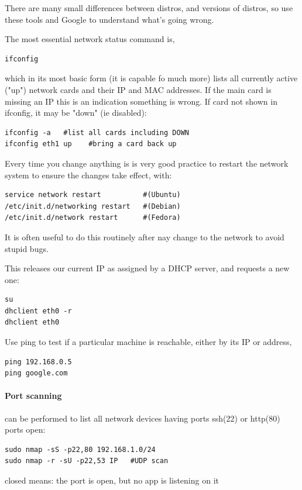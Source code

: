 \documentclass[oneside,english]{scrbook}
\begin{document}
There are many small differences between distros, and versions of
distros, so use these tools and Google to understand what's going
wrong.

The most essential network status command is,
\begin{lstlisting}
ifconfig
\end{lstlisting}
which in its most basic form (it is capable fo much more) lists all currently active ("up") network cards and their IP and MAC addresses.  If the main card is missing an IP this is an indication something is wrong.  If card not shown in ifconfig, it may be "down" (ie disabled): 
\begin{lstlisting}
ifconfig -a   #list all cards including DOWN 
ifconfig eth1 up    #bring a card back up
\end{lstlisting}

Every time you change anything is is very good practice to restart the network system to ensure the changes take effect, with:

\begin{lstlisting}
service network restart			 #(Ubuntu)
/etc/init.d/networking restart   #(Debian)
/etc/init.d/network restart      #(Fedora)
\end{lstlisting}
It is often useful to do this routinely after nay change to the network to avoid stupid bugs.

This releases our current IP as assigned by a DHCP server, and requests a new one:
\begin{lstlisting}
su
dhclient eth0 -r
dhclient eth0
\end{lstlisting}

Use ping to test if a particular machine is reachable, either by its IP or address,
\begin{lstlisting}
ping 192.168.0.5
ping google.com
\end{lstlisting}

\paragraph{Port scanning} can be performed to list all network devices having ports ssh(22) or http(80) ports open:
\begin{lstlisting}
sudo nmap -sS -p22,80 192.168.1.0/24
sudo nmap -r -sU -p22,53 IP   #UDP scan
\end{lstlisting}
closed means: the port is open, but no app is listening on it
\end{document}
